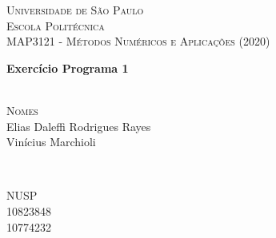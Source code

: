 \documentclass[12pt]{article}
\begin{document}
\begin{titlepage}

\newcommand{\HRule}{\rule{\linewidth}{0.5mm}} 
\center
 

\textsc{\LARGE Universidade de São Paulo}\\[1.5cm]
\textsc{\Large Escola Politécnica}\\[0.5cm] 
\textsc{\large MAP3121 - Métodos Numéricos e Aplicações (2020)}\\
\vspace{70mm}

{\huge \bfseries Exercício Programa 1}\\[0.6cm]
\textsc{\large }\\[2.5cm]
 
\vspace{60mm}
\begin{minipage}{0.4\textwidth}
\begin{flushleft} \large
\footnotesize{\textsc{Nomes}}\\
Elias Daleffi Rodrigues Rayes\\
Vinícius Marchioli\\


\end{flushleft}
\end{minipage}
~
\begin{minipage}{0.4\textwidth}
\begin{flushright} \large
\footnotesize{\textsc{NUSP}}\\
10823848\\
10774232\\

\end{flushright}
\end{minipage}\\[7.5cm]




\vfill 

\end{titlepage}
\end{document}
